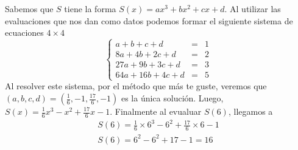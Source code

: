 \begin{section-problem}
            \begin{solution}[2]
                Sabemos que $S$ tiene la forma $S(x) = a x^3 + b x^2 + c x + d$.
                Al utilizar las evaluaciones que nos dan como datos podemos formar el siguiente sistema de ecuaciones $4 \times 4$
                \[
                    \left\{
                    \begin{array}{rcl}
                        a +   b +  c + d & = & 1\\
                        8a +  4b + 2c + d & = & 2\\
                        27a +  9b + 3c + d & = & 3\\
                        64a + 16b + 4c + d & = & 5
                    \end{array}
                    \right.
                \]
                Al resolver este sistema, por el método que más te guste, veremos que $(a, b, c, d) =  \left(\frac{1}{6}, -1, \frac{17}{6}, -1\right)$ es la única solución.
                Luego, $S(x) = \frac{1}{6} x^3 - x^2 + \frac{17}{6} x - 1$.
                Finalmente al evualuar $S(6)$, llegamos a
                \begin{gather*}
                    S(6) = \frac{1}{6} \times 6^3 - 6^2 + \frac{17}{6} \times 6 - 1\\
                    S(6) = 6^2 - 6^2 + 17 - 1 = \boxed{16}
                \end{gather*}
            \end{solution}
        \end{section-problem}

